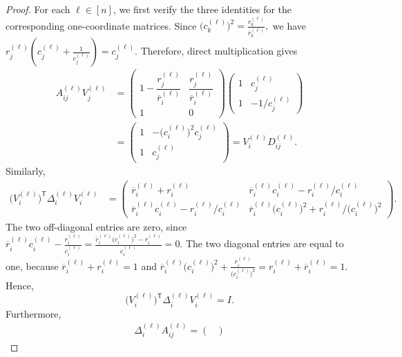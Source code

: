 \documentclass[11pt]{article}
\numberwithin{equation}{section}
\theoremstyle{definition}
\theoremstyle{remark}
\begin{document}
\begin{proof}
For each $\ell\in[n]$, we first verify the three identities for the
corresponding one-coordinate matrices. Since
$
 \bigl(c_k^{(\ell)}\bigr)^2
 =
 \frac{r_k^{(\ell)}}{\overline r_k^{(\ell)}},
$
we have
$
 r_j^{(\ell)}
 \left(
  c_j^{(\ell)}+\frac{1}{c_j^{(\ell)}}
 \right)
 =
 c_j^{(\ell)}.
$
Therefore, direct multiplication gives
$$
\begin{aligned}
 A_{ij}^{(\ell)}V_j^{(\ell)}
 &=
 \begin{pmatrix}
  1-\dfrac{r_j^{(\ell)}}{\overline r_i^{(\ell)}}&
  \dfrac{r_j^{(\ell)}}{\overline r_i^{(\ell)}}\\[5pt]
  1&0
 \end{pmatrix}
 \begin{pmatrix}
  1&c_j^{(\ell)}\\[2pt]
  1&-1/c_j^{(\ell)}
 \end{pmatrix}\\
 &=
 \begin{pmatrix}
  1&-\bigl(c_i^{(\ell)}\bigr)^2c_j^{(\ell)}\\
  1&c_j^{(\ell)}
 \end{pmatrix}
 =
 V_i^{(\ell)}D_{ij}^{(\ell)}.
\end{aligned}
$$
Similarly,
$$
\begin{aligned}
 \bigl(V_i^{(\ell)}\bigr)^{\mathsf T}
 \Delta_i^{(\ell)}V_i^{(\ell)}
 &=
 \begin{pmatrix}
  \overline r_i^{(\ell)}+r_i^{(\ell)}&
  \overline r_i^{(\ell)}c_i^{(\ell)}
  -r_i^{(\ell)}/c_i^{(\ell)}\\[2pt]
  \overline r_i^{(\ell)}c_i^{(\ell)}
  -r_i^{(\ell)}/c_i^{(\ell)}&
  \overline r_i^{(\ell)}\bigl(c_i^{(\ell)}\bigr)^2
  +r_i^{(\ell)}/\bigl(c_i^{(\ell)}\bigr)^2
 \end{pmatrix}.
\end{aligned}
$$
The two off-diagonal entries are zero, since
$
 \overline r_i^{(\ell)}c_i^{(\ell)}
 -\frac{r_i^{(\ell)}}{c_i^{(\ell)}}
 =
 \frac{
  \overline r_i^{(\ell)}\bigl(c_i^{(\ell)}\bigr)^2
  -r_i^{(\ell)}
 }{c_i^{(\ell)}}
 =0.
$
The two diagonal entries are equal to one, because
$
 \overline r_i^{(\ell)}+r_i^{(\ell)}=1
$
and
$
 \overline r_i^{(\ell)}\bigl(c_i^{(\ell)}\bigr)^2
 +\frac{r_i^{(\ell)}}{\bigl(c_i^{(\ell)}\bigr)^2}
 =
 r_i^{(\ell)}+\overline r_i^{(\ell)}
 =1.
$
Hence,
$$
 \bigl(V_i^{(\ell)}\bigr)^{\mathsf T}
 \Delta_i^{(\ell)}V_i^{(\ell)}
 =I.
$$
Furthermore,
$$
\begin{aligned}
 \Delta_i^{(\ell)}A_{ij}^{(\ell)}
 =
 \begin{pmatrix}

\end{pmatrix}
\end{aligned}$$
\end{proof}
\end{document}
